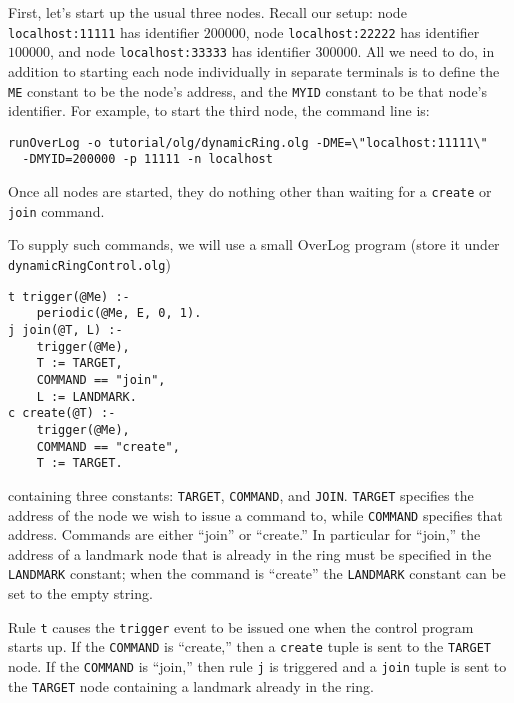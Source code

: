 \documentclass{article}
\begin{document}
First, let's start up the usual three nodes. Recall our setup: 
node \lstinline$localhost:11111$ has identifier $200000$, node
\lstinline$localhost:22222$ has identifier $100000$, and node
\lstinline$localhost:33333$ has identifier $300000$. All we need to do,
in addition to starting each node individually in separate terminals is
to define the \texttt{ME} constant to be the node's address, and the
\texttt{MYID} constant to be that node's identifier. For example, to
start the third node, the command line is:
\begin{verbatim}
runOverLog -o tutorial/olg/dynamicRing.olg -DME=\"localhost:11111\"
  -DMYID=200000 -p 11111 -n localhost
\end{verbatim}
Once all nodes are started, they do nothing other than waiting for a
\lstinline$create$ or \lstinline$join$ command.

To supply such commands, we will use a small OverLog program (store it
under \texttt{dynamicRingControl.olg})
\begin{lstlisting}
t trigger(@Me) :-
	periodic(@Me, E, 0, 1).
j join(@T, L) :-
	trigger(@Me),
	T := TARGET,
	COMMAND == "join",
	L := LANDMARK.
c create(@T) :-
	trigger(@Me),
	COMMAND == "create",
	T := TARGET.
\end{lstlisting}
containing three constants: \texttt{TARGET}, \texttt{COMMAND}, and \texttt{JOIN}.
\texttt{TARGET} specifies the address of the node we wish to issue a
command to, while \texttt{COMMAND} specifies that address. Commands are
either ``join'' or ``create.'' In particular for ``join,'' the address
of a landmark node that is already in the ring must be specified in the
\texttt{LANDMARK} constant; when the command is ``create'' the
\texttt{LANDMARK} constant can be set to the empty string.

Rule \lstinline$t$ causes the \lstinline$trigger$ event to be issued one
when the control program starts up. If the \texttt{COMMAND} is
``create,'' then a \lstinline$create$ tuple is sent to the
\texttt{TARGET} node. If the \texttt{COMMAND} is ``join,''
then rule \lstinline$j$ is triggered and a \lstinline$join$ tuple is
sent to the \texttt{TARGET} node containing a landmark already in the ring.
\end{document}
